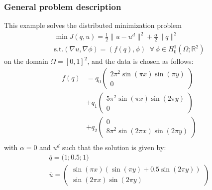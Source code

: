 \subsubsection{General problem description}
This example solves the distributed minimization problem
\begin{gather*}
\min J(q,u) = \frac{1}{2} \|u-u^d\|^2 + \frac{\alpha}{2}\|q\|^2\\
\text{s.t.} (\nabla u,\nabla \phi) = (f(q),\phi)\;\;\forall\,\phi \in H^1_0(\Omega; \mathbb R^2)
\end{gather*}
on the domain $\Omega = [0,1]^2$, and the data is chosen as follows:
\begin{align*}
 f(q) &= q_0 \left(\begin{matrix}2\pi^2  \sin( \pi x) \sin(\pi y)\\0 \end{matrix}\right)\\
      &+ q_1 \left(\begin{matrix}5\pi^2  \sin( \pi x) \sin(2\pi y)\\0 \end{matrix}\right)\\
      &+ q_2 \left(\begin{matrix}0 \\8\pi^2  \sin(2\pi x) \sin(2\pi y)\end{matrix}\right)\\
\end{align*}
with $\alpha = 0$ and $u^d$ such that the solution is given by:
\begin{gather*}
 \overline{q} = \bigl(1;0.5;1\bigr)\\
 \overline{u} = \left(\begin{matrix} \sin( \pi x)( \sin(\pi y)+0.5\sin(2\pi y))\\\sin(2\pi x) \sin(2\pi y) \end{matrix}\right)
\end{gather*}
